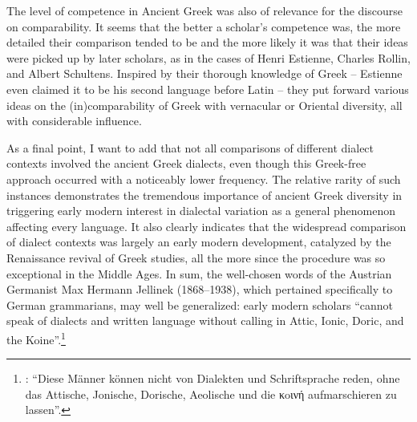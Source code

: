 The level of competence in Ancient Greek was also of relevance for the discourse on comparability. It seems that the better a scholar’s competence was, the more detailed their comparison tended to be and the more likely it was that their ideas were picked up by later scholars, as in the cases of Henri Estienne, Charles Rollin, and Albert Schultens. Inspired by their thorough knowledge of Greek – Estienne even claimed it to be his second language before Latin – they put forward various ideas on the (in)comparability of Greek with vernacular or Oriental diversity, all with considerable influence.

As a final point, I want to add that not all comparisons of different dialect contexts involved the ancient Greek dialects, even though this Greek-free approach occurred with a noticeably lower frequency. The relative rarity of such instances demonstrates the tremendous importance of ancient Greek diversity in triggering early modern interest in dialectal variation as a general phenomenon affecting every language. It also clearly indicates that the widespread comparison of dialect contexts was largely an early modern development, catalyzed by the Renaissance revival of Greek studies, all the more since the procedure was so exceptional in the Middle Ages. In sum, the well-chosen words of the Austrian Germanist Max Hermann Jellinek (1868–1938), which pertained specifically to German grammarians, may well be generalized: early modern scholars “cannot speak of dialects and written language without calling in Attic, Ionic, Doric, and the Koine”.\footnote{\citet[\textsc{i}.21]{Jellinek1913}: “Diese Männer können nicht von Dialekten und Schriftsprache reden, ohne das Attische, Jonische, Dorische, Aeolische und die κoινή aufmarschieren zu lassen”.}

